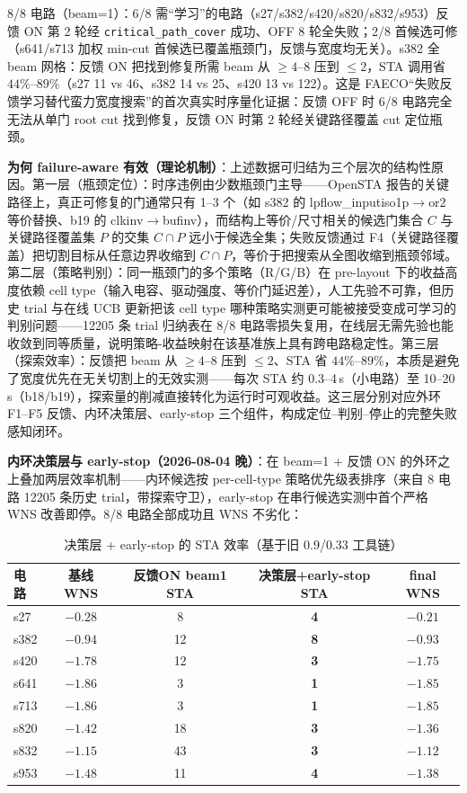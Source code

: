 \documentclass[journal]{IEEEtran}
\begin{document}
8/8 电路（beam=1）：6/8 需“学习”的电路（s27/s382/s420/s820/s832/s953）反馈 ON 第 2 轮经 \texttt{critical\_path\_cover} 成功、OFF 8 轮全失败；2/8 首候选可修（s641/s713 加权 min-cut 首候选已覆盖瓶颈门，反馈与宽度均无关）。s382 全 beam 网格：反馈 ON 把找到修复所需 beam 从 $\geq 4$--$8$ 压到 $\leq 2$，STA 调用省 $44\%$--$89\%$（s27 11 vs 46、s382 14 vs 25、s420 13 vs 122）。这是 FAECO“失败反馈学习替代蛮力宽度搜索”的首次真实时序量化证据：反馈 OFF 时 6/8 电路完全无法从单门 root cut 找到修复，反馈 ON 时第 2 轮经关键路径覆盖 cut 定位瓶颈。


\textbf{为何 failure-aware 有效（理论机制）}：上述数据可归结为三个层次的结构性原因。第一层（瓶颈定位）：时序违例由少数瓶颈门主导——OpenSTA 报告的关键路径上，真正可修复的门通常只有 1--3 个（如 s382 的 lpflow\_inputiso1p$\rightarrow$or2 等价替换、b19 的 clkinv$\rightarrow$bufinv），而结构上等价/尺寸相关的候选门集合 $C$ 与关键路径覆盖集 $P$ 的交集 $C\cap P$ 远小于候选全集；失败反馈通过 F4（关键路径覆盖）把切割目标从任意边界收缩到 $C\cap P$，等价于把搜索从全图收缩到瓶颈邻域。第二层（策略判别）：同一瓶颈门的多个策略（R/G/B）在 pre-layout 下的收益高度依赖 cell type（输入电容、驱动强度、等价门延迟差），人工先验不可靠，但历史 trial 与在线 UCB 更新把该 cell type 哪种策略实测更可能被接受变成可学习的判别问题——12205 条 trial 归纳表在 8/8 电路零损失复用，在线层无需先验也能收敛到同等质量，说明策略-收益映射在该基准族上具有跨电路稳定性。第三层（探索效率）：反馈把 beam 从 $\geq 4$--$8$ 压到 $\leq 2$、STA 省 $44\%$--$89\%$，本质是避免了宽度优先在无关切割上的无效实测——每次 STA 约 0.3--4\,s（小电路）至 10--20\,s（b18/b19），探索量的削减直接转化为运行时可观收益。这三层分别对应外环 F1--F5 反馈、内环决策层、early-stop 三个组件，构成定位--判别--停止的完整失败感知闭环。

\textbf{内环决策层与 early-stop（2026-08-04 晚）}：在 beam=1 + 反馈 ON 的外环之上叠加两层效率机制——内环候选按 per-cell-type 策略优先级表排序（来自 8 电路 12205 条历史 trial，带探索守卫），early-stop 在串行候选实测中首个严格 WNS 改善即停。8/8 电路全部成功且 WNS 不劣化：

\begin{table}[!t]
\centering
\caption{决策层 + early-stop 的 STA 效率（基于旧 0.9/0.33 工具链）}
\label{tab:decision_early}
\scriptsize
\setlength{\tabcolsep}{3pt}
\begin{tabular}{lcccc}
\toprule
\textbf{电路} & \textbf{基线 WNS} & \textbf{反馈ON beam1 STA} & \textbf{决策层+early-stop STA} & \textbf{final WNS} \\
\midrule
s27  & $-0.28$ & 8 & \textbf{4} & $-0.21$ \\
s382 & $-0.94$ & 12 & \textbf{8} & $-0.93$ \\
s420 & $-1.78$ & 12 & \textbf{3} & $-1.75$ \\
s641 & $-1.86$ & 3 & \textbf{1} & $-1.85$ \\
s713 & $-1.86$ & 3 & \textbf{1} & $-1.85$ \\
s820 & $-1.42$ & 18 & \textbf{3} & $-1.36$ \\
s832 & $-1.15$ & 43 & \textbf{3} & $-1.12$ \\
s953 & $-1.48$ & 11 & \textbf{4} & $-1.38$ \\
\bottomrule
\end{tabular}
\end{table}
\end{document}
